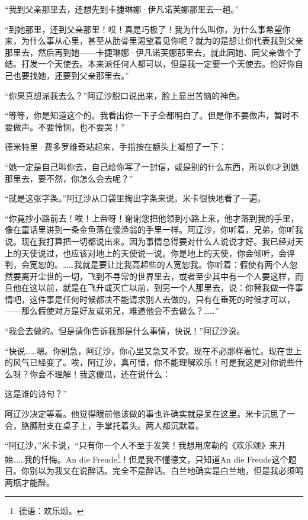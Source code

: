 \par “我到父亲那里去，还想先到卡捷琳娜·伊凡诺芙娜那里去一趟。”
\par “到她那里，还到父亲那里！哎！真是巧极了！我为什么叫你，为什么事希望你来，为什么事从心里，甚至从肋骨里渴望着见你呢？就为的是想让你代表我到父亲那里去，然后再到她——卡捷琳娜·伊凡诺芙娜那里去，就此同她、同父亲做个了结。打发一个天使去。本来派任何人都可以，但是我一定要一个天使去。恰好你自己也要找她，还要到父亲那里去。”
\par “你果真想派我去么？”阿辽沙脱口说出来，脸上显出苦恼的神色。
\par “等等，你是知道这个的。我看出你一下子全都明白了。但是你不要做声，暂时不要做声。不要怜悯，也不要哭！”
\par 德米特里·费多罗维奇站起来，手指按在额头上凝想了一下：
\par “她一定是自己叫你去，自己给你写了一封信，或是别的什么东西，所以你才到她那里去，要不然，你怎么会去呢？”
\par “就是这张字条。”阿辽沙从口袋里掏出字条来说。米卡很快地看了一遍。
\par “你竟抄小路前去！唉！上帝呀！谢谢您把他领到小路上来，他才落到我的手里，像在童话里讲到一条金鱼落在傻渔翁的手里一样。阿辽沙，你听着，兄弟，你听我说。现在我打算把一切都说出来。因为事情总得要对什么人说说才好。我已经对天上的天使说过，也应该对地上的天使说一说。你是地上的天使，你会倾听，会评判，会宽恕的。……我就是要让比我高超些的人宽恕我。你听着：假使有两个人忽然要离开尘世的一切，飞到不寻常的世界里去，或者至少其中有一个人要这样，而且他在这以前，就是在飞升或灭亡以前，到另一个人那里去，说：你替我做一件事情吧，这件事是任何时候都决不能请求别人去做的，只有在垂死的时候才可以，——那么假使对方是好友或弟兄，难道他会不去做么？……”
\par “我会去做的。但是请你告诉我那是什么事情，快说！”阿辽沙说。
\par “快说……嗯。你别急，阿辽沙，你心里又急又不安。现在不必那样着忙。现在世上的风气已经变了。唉，阿辽沙，真可惜，你不能理解欢乐！可是我这是对你说些什么呀？你会不理解！我这傻瓜，还在说什么：
\par 这是谁的诗句？”
\par 阿辽沙决定等着。他觉得眼前他该做的事也许确实就是呆在这里。米卡沉思了一会，胳膊肘支在桌子上，手掌托着头。两人都沉默着。
\par “阿辽沙，”米卡说，“只有你一个人不至于发笑！我想用席勒的《欢乐颂》来开始……我的忏悔。An die Freude\footnote{德语：欢乐颂。}！但是我不懂德文，只知道An die Freude这个题目。你别以为我又在说醉话。完全不是醉话。白兰地确实是白兰地，但是我必须喝两瓶才能醉。
